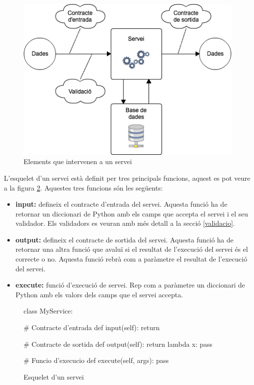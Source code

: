 	\begin{figure}[h!]
		\includegraphics[scale=0.5]{img/servei.png}
   		\centering
    	\caption{Elements que intervenen a un servei}
   	 	\label{fig:servei}
	\end{figure}
	
	L'esquelet d'un servei està definit per tres principals funcions, aquest es pot veure a la figura \ref{fig:esquelet_servei}. Aquestes tres funcions són les següents:
	
	\begin{itemize}
		\item \textbf{input:} defineix el contracte d'entrada del servei. Aquesta funció ha de retornar un diccionari de Python amb els camps que accepta el servei i el seu validador. Els validadors es veuran amb més detall a la secció \ref{validacio}.
		 
		\item \textbf{output:} defineix el contracte de sortida del servei. Aquesta funció ha de retornar una altra funció que avaluï si el resultat de l'execució del servei és el correcte o no. Aquesta funció rebrà com a paràmetre el resultat de l'execució del servei.
		
		\item \textbf{execute:} funció d'execució de servei. Rep com a paràmetre un diccionari de Python amb els valors dels camps que el servei accepta.
	\end{itemize}
	
	\begin{figure}[h!]
		\begin{python}
class MyService:
	
	# Contracte d'entrada
	def input(self):
		return {}
	
	# Contracte de sortida
	def output(self):
		return lambda x: pass
		
	# Funcio d'execucio
	def execute(self, args):
		pass
		\end{python}
		\caption{Esquelet d'un servei}
		\label{fig:esquelet_servei}
	\end{figure}
	
